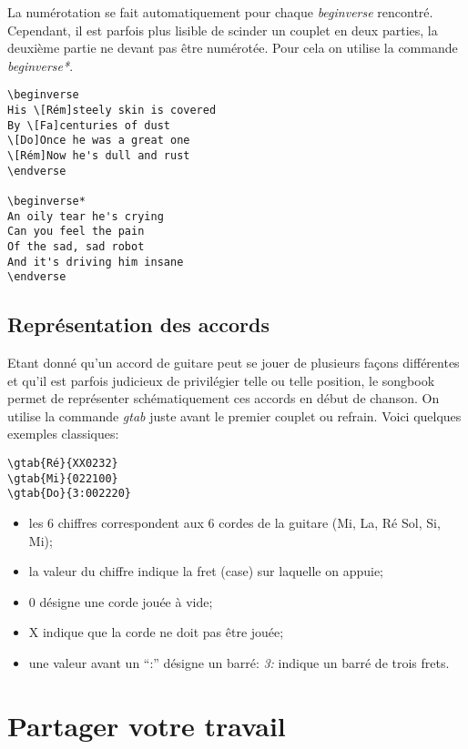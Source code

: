 \documentclass[a4paper,twoside]{article}
\begin{document}
La numérotation se fait automatiquement pour chaque \emph{beginverse}
rencontré. Cependant, il est parfois plus lisible de scinder un
couplet en deux parties, la deuxième partie ne devant pas être
numérotée. Pour cela on utilise la commande \emph{beginverse*}.
 
\begin{verbatim}
\beginverse
His \[Rém]steely skin is covered
By \[Fa]centuries of dust
\[Do]Once he was a great one
\[Rém]Now he's dull and rust
\endverse

\beginverse*
An oily tear he's crying
Can you feel the pain
Of the sad, sad robot
And it's driving him insane
\endverse
\end{verbatim}

\subsection{Représentation des accords}

Etant donné qu'un accord de guitare peut se jouer de plusieurs façons
différentes et qu'il est parfois judicieux de privilégier telle ou
telle position, le songbook permet de représenter schématiquement ces
accords en début de chanson. On utilise la commande \emph{gtab} juste
avant le premier couplet ou refrain. Voici quelques exemples classiques:

\begin{verbatim}
\gtab{Ré}{XX0232}
\gtab{Mi}{022100}
\gtab{Do}{3:002220}
\end{verbatim}

\begin{itemize}
\item les 6 chiffres correspondent aux 6 cordes de la
guitare (Mi, La, Ré Sol, Si, Mi);
\item la valeur du chiffre indique la fret (case) sur laquelle on
  appuie;
\item 0 désigne une corde jouée à vide;
\item X indique que la corde ne doit pas être jouée;
\item une valeur avant un ``:'' désigne un barré: \emph{3:} indique
un barré de trois frets.
\end{itemize}


\section{Partager votre travail}
\end{document}

